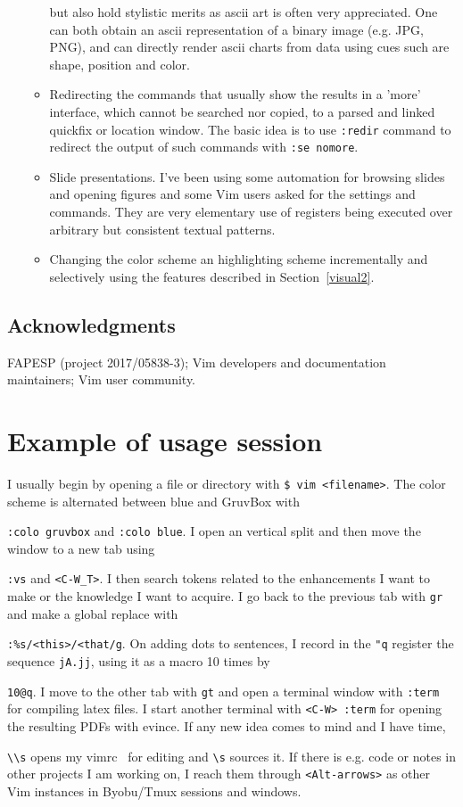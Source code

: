 \documentclass{article}
\newcommand{\ttt}[1] {
	\texttt{<#1>}}
\newcommand{\tttt}[1] {
	\texttt{#1}}
\begin{document}
\begin{itemize}
\begin{itemize}
        but also hold stylistic merits as ascii art is often
        very appreciated.
        One can both obtain an ascii representation of a binary image (e.g. JPG, PNG),
        and can directly render ascii charts from data using cues such are shape, position
        and color.
      \item Redirecting the commands that usually show the results in a 'more' interface,
        which cannot be searched nor copied,
        to a parsed and linked quickfix or location window.
        The basic idea is to use \tttt{:redir} command to redirect the output
        of such commands with \tttt{:se nomore}.
      \item Slide presentations. I've been using some automation for browsing
        slides and opening figures and some Vim users asked for the settings and
        commands. They are very elementary use of registers being executed over
        arbitrary but consistent textual patterns.
      \item Changing the color scheme an highlighting scheme incrementally
        and selectively using the features described in Section~\ref{visual2}.
    \end{itemize}
\end{itemize}

\subsection*{Acknowledgments}
FAPESP (project 2017/05838-3); Vim developers and documentation maintainers;
Vim user community. 

\appendix
\section{Example of usage session}
I usually begin by opening a file or directory
with \tttt{\$ vim <filename>}.
The color scheme is alternated between
blue and GruvBox with
\tttt{:colo gruvbox} and \tttt{:colo blue}.
I open an vertical split and then move
the window to a new tab using
\tttt{:vs} and \ttt{C-W\_T}.
I then search tokens related to
the enhancements I want to make or
the knowledge I want to acquire.
I go back to the previous tab with \tttt{gr}
and make a global replace with
\tttt{:\%s/<this>/<that/g}.
On adding dots to sentences,
I record in the \tttt{"q} register
the sequence \tttt{jA.jj},
using it as a macro 10 times by
\tttt{10@q}.
I move to the other tab with \tttt{gt}
and open a terminal window with \tttt{:term}
for compiling latex files.
I start another terminal with \tttt{<C-W> :term}
for opening the resulting PDFs with evince.
If any new idea comes to mind and I have time,
\tttt{\textbackslash\textbackslash s} opens 
my vimrc~\cite{vimrc} for editing and \tttt{\textbackslash s}
sources it.
If there is e.g. code or notes in other projects I am working
on, I reach them through \tttt{<Alt-arrows>} as other Vim instances
in Byobu/Tmux sessions and windows.
\end{document}
